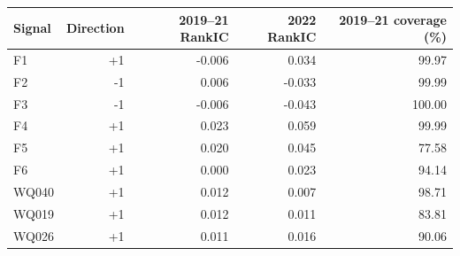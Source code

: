 \begin{tabular}{lrrrr}
\toprule
Signal & Direction & 2019--21 RankIC & 2022 RankIC & 2019--21 coverage (\%) \\
\midrule
F1 & +1 & -0.006 & 0.034 & 99.97 \\
F2 & -1 & 0.006 & -0.033 & 99.99 \\
F3 & -1 & -0.006 & -0.043 & 100.00 \\
F4 & +1 & 0.023 & 0.059 & 99.99 \\
F5 & +1 & 0.020 & 0.045 & 77.58 \\
F6 & +1 & 0.000 & 0.023 & 94.14 \\
WQ040 & +1 & 0.012 & 0.007 & 98.71 \\
WQ019 & +1 & 0.012 & 0.011 & 83.81 \\
WQ026 & +1 & 0.011 & 0.016 & 90.06 \\
\bottomrule
\end{tabular}
